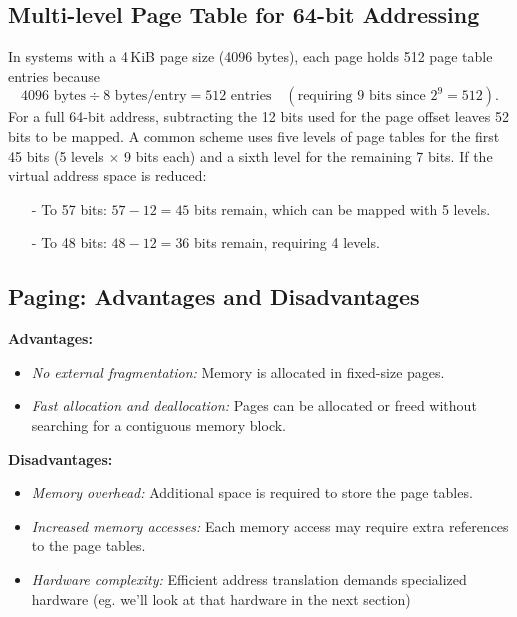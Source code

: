 \subsection{Multi-level Page Table for 64-bit Addressing}
In systems with a 4\,KiB page size (4096 bytes), each page holds 512 page table entries because 
\[
4096 \text{ bytes} \div 8 \text{ bytes/entry} = 512 \text{ entries} \quad (\text{requiring } 9 \text{ bits since } 2^9 = 512).
\]
For a full 64-bit address, subtracting the 12 bits used for the page offset leaves 52 bits to be mapped. A common scheme uses five levels of page tables for the first 45 bits (5 levels $\times$ 9 bits each) and a sixth level for the remaining 7 bits. If the virtual address space is reduced:
\begin{itemize}
  \item[-] To 57 bits: $57 - 12 = 45$ bits remain, which can be mapped with 5 levels.
  \item[-] To 48 bits: $48 - 12 = 36$ bits remain, requiring 4 levels.
\end{itemize}

\subsection{Paging: Advantages and Disadvantages}
\textbf{Advantages:}
\begin{itemize}
    \item \emph{No external fragmentation:} Memory is allocated in fixed-size pages.
    \item \emph{Fast allocation and deallocation:} Pages can be allocated or freed without searching for a contiguous memory block.
\end{itemize}

\textbf{Disadvantages:}
\begin{itemize}
    \item \emph{Memory overhead:} Additional space is required to store the page tables.
    \item \emph{Increased memory accesses:} Each memory access may require extra references to the page tables.
    \item \emph{Hardware complexity:} Efficient address translation demands specialized hardware (eg. we'll look at that hardware in the next section)
  \end{itemize}

